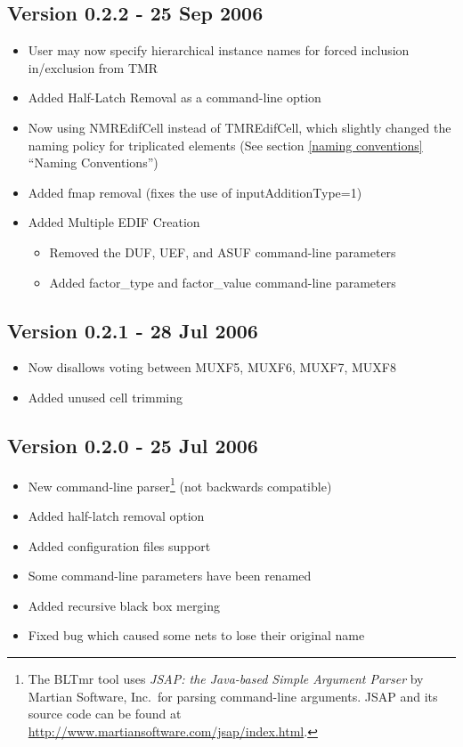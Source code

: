 \documentclass[english]{article}
\begin{document}
\subsection*{Version 0.2.2 - 25 Sep 2006}
\begin{itemize}
  \item User may now specify hierarchical instance names for forced inclusion
  in/exclusion from TMR
  \item Added Half-Latch Removal as a command-line option
  \item Now using NMREdifCell instead of TMREdifCell, which slightly changed the
  naming policy for triplicated elements (See section \ref{naming conventions}
  ``Naming Conventions'')
  \item Added fmap removal (fixes the use of inputAdditionType=1)
  \item Added Multiple EDIF Creation
  \begin{itemize}
    \item Removed the DUF, UEF, and ASUF command-line parameters
    \item Added factor\_type and factor\_value command-line parameters
  \end{itemize}
\end{itemize}

\subsection*{Version 0.2.1 - 28 Jul 2006}
\begin{itemize}
\item Now disallows voting between MUXF5, MUXF6, MUXF7, MUXF8
\item Added unused cell trimming
\end{itemize}

\subsection*{Version 0.2.0 - 25 Jul 2006}
\begin{itemize}
\item New command-line parser\footnote{The BLTmr tool uses \emph{JSAP: the 
Java-based Simple Argument Parser} by Martian Software, Inc.\ for parsing 
command-line arguments.  JSAP and its source code can be found at 
\url{http://www.martiansoftware.com/jsap/index.html}.} (not backwards 
compatible)
\item Added half-latch removal option
\item Added configuration files support
\item Some command-line parameters have been renamed
\item Added recursive black box merging
\item Fixed bug which caused some nets to lose their original name
\end{itemize}
\end{document}

